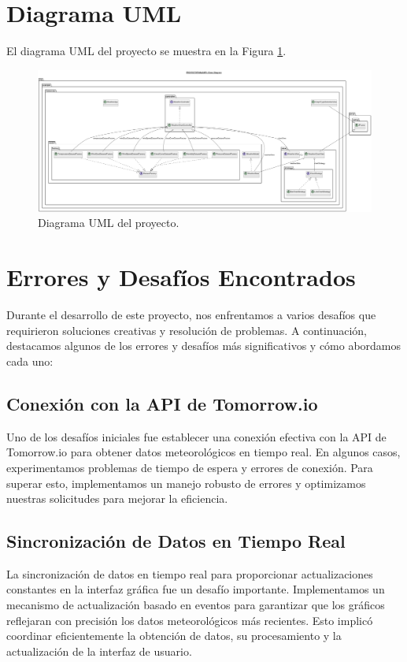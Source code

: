 \documentclass{article}
\begin{document}
\newpage 

\section{Diagrama UML}
El diagrama UML del proyecto se muestra en la Figura \ref{fig:uml}.


\begin{figure}[H]
    \centering
    \includegraphics[width=1.0\textwidth]{images/image0.png}
    \caption{Diagrama UML del proyecto.}
    \label{fig:uml}
\end{figure}

\section{Errores y Desafíos Encontrados}
Durante el desarrollo de este proyecto, nos enfrentamos a varios desafíos que requirieron soluciones creativas y resolución de problemas. A continuación, destacamos algunos de los errores y desafíos más significativos y cómo abordamos cada uno:

\subsection{Conexión con la API de Tomorrow.io}
Uno de los desafíos iniciales fue establecer una conexión efectiva con la API de Tomorrow.io para obtener datos meteorológicos en tiempo real. En algunos casos, experimentamos problemas de tiempo de espera y errores de conexión. Para superar esto, implementamos un manejo robusto de errores y optimizamos nuestras solicitudes para mejorar la eficiencia.

\subsection{Sincronización de Datos en Tiempo Real}
La sincronización de datos en tiempo real para proporcionar actualizaciones constantes en la interfaz gráfica fue un desafío importante. Implementamos un mecanismo de actualización basado en eventos para garantizar que los gráficos reflejaran con precisión los datos meteorológicos más recientes. Esto implicó coordinar eficientemente la obtención de datos, su procesamiento y la actualización de la interfaz de usuario.
\end{document}
